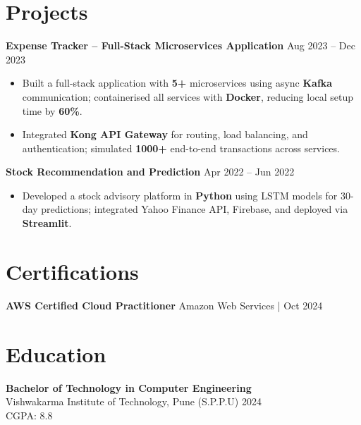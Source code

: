 \documentclass[a4paper,10pt]{article}
\begin{document}
\section*{Projects}

\textbf{Expense Tracker -- Full-Stack Microservices Application} \hfill Aug 2023 -- Dec 2023
\begin{itemize}[leftmargin=*]
    \item Built a full-stack application with \textbf{5+} microservices using async \textbf{Kafka} communication; containerised all services with \textbf{Docker}, reducing local setup time by \textbf{60\%}.
    \item Integrated \textbf{Kong API Gateway} for routing, load balancing, and authentication; simulated \textbf{1000+} end-to-end transactions across services.
\end{itemize}
\textbf{Stock Recommendation and Prediction} \hfill Apr 2022 -- Jun 2022
\begin{itemize}[leftmargin=*]
    \item Developed a stock advisory platform in \textbf{Python} using LSTM models for 30-day predictions; integrated Yahoo Finance API, Firebase, and deployed via \textbf{Streamlit}.
\end{itemize}

\section*{Certifications}
\textbf{AWS Certified Cloud Practitioner} \hfill Amazon Web Services \;|\; Oct 2024 \\

\section*{Education}

\textbf{Bachelor of Technology in Computer Engineering} \\
Vishwakarma Institute of Technology, Pune (S.P.P.U) \hfill 2024 \\
CGPA: 8.8
\end{document}
